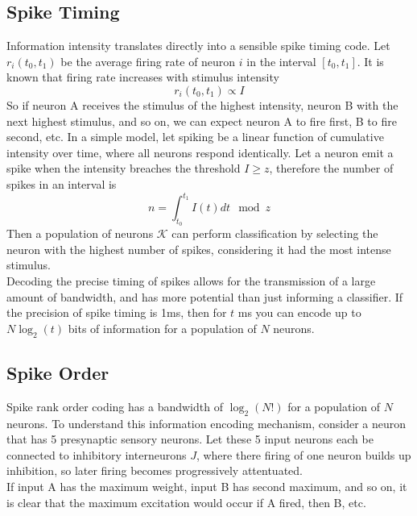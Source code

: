 \documentclass[11pt, a4paper]{article}
\begin{document}
\subsection{Spike Timing}
Information intensity translates directly into a sensible spike timing code. Let $r_i(t_0,t_1)$ be the average firing rate of neuron $i$ in the interval $[t_0,t_1]$. It is known that firing rate increases with stimulus intensity 
\begin{equation}
    r_i(t_0,t_1) \propto I
\end{equation}
So if neuron A receives the stimulus of the highest intensity, neuron B with the next highest stimulus, and so on, we can expect neuron A to fire first, B to fire second, etc. In a simple model, let spiking be a linear function of cumulative intensity over time, where all neurons respond identically. Let a neuron emit a spike when the intensity breaches the threshold $I\ge z$, therefore the number of spikes in an interval is 
\begin{equation}
    n = \int_{t_0}^{t_1} I(t) dt  \mod z
\end{equation}
Then a population of neurons $\mathcal{K}$ can perform classification by selecting the neuron with the highest number of spikes, considering it had the most intense stimulus.\\

Decoding the precise timing of spikes allows for the transmission of a large amount of bandwidth, and has more potential than just informing a classifier. If the precision of spike timing is 1ms, then for $t$ ms you can encode up to $N\log_2(t)$ bits of information for a population of $N$ neurons.


\subsection{Spike Order}
Spike rank order coding has a bandwidth of $\log_2(N!)$ for a population of $N$ neurons. To understand this information encoding mechanism, consider a neuron that has 5 presynaptic sensory neurons. Let these 5 input neurons each be connected to inhibitory interneurons $J$, where there firing of one neuron builds up inhibition, so later firing becomes progressively attentuated. \\ 

If input A has the maximum weight, input B has second maximum, and so on, it is clear that the maximum excitation would occur if A fired, then B, etc.
\end{document}
